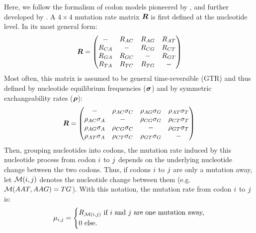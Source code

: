Here, we follow the formalism of \gls{codon} models pioneered by \citet{Muse1994}, and further developed by \citet{Nielsen1998}.
A $4 \times 4$ mutation rate matrix $\bm{R}$ is first defined at the nucleotide level.
In its most general form:
\begin{equation}
    \label{eq:mutrates}
    \bm{R} =
    \begin{pmatrix}
        - & {R_{AC}} & {R_{AG}} & {R_{AT}} \\
        {R_{CA}} &                 - & {R_{CG}} & {R_{CT}} \\
        {R_{GA}} & {R_{GC}} &                 - & {R_{GT}} \\
        {R_{TA}} & {R_{TC}} & {R_{TG}} & -
    \end{pmatrix}
\end{equation}
Most often, this matrix is assumed to be general time-reversible (GTR) and thus defined by nucleotide equilibrium frequencies ($\bm{\sigma}$) and by symmetric exchangeability rates ($\bm{\rho}$):
\begin{equation}
    \label{eq:mutrates-GTR}
    \bm{R} =
    \begin{pmatrix}
        - & {\rho_{AC}\sigma_C} & {\rho_{AG}\sigma_G} & {\rho_{AT}\sigma_T} \\
        {\rho_{AC}\sigma_A} &                        - & {\rho_{CG}\sigma_G} & {\rho_{CT}\sigma_T} \\
        {\rho_{AG}\sigma_A} & {\rho_{CG}\sigma_C} &                        - & {\rho_{GT}\sigma_T} \\
        {\rho_{AT}\sigma_A} & {\rho_{CT}\sigma_C} & {\rho_{GT}\sigma_G} & -
    \end{pmatrix}
\end{equation}
Then, grouping nucleotides into codons, the mutation rate induced by this nucleotide process from \gls{codon} ${i}$ to ${j}$ depends on the underlying nucleotide change between the two codons.
Thus, if codons ${i}$ to ${j}$ are only a mutation away, let $\mathcal{M}({i}, {j})$ denotes the nucleotide change between them (e.g. $\mathcal{M}(AAT, AAG) = TG$).
With this notation, the mutation rate from \gls{codon} ${i}$ to ${j}$ is:
\begin{equation}
    \mu_{{i}, {j}} =
    \begin{dcases}
        R_{\mathcal{M}({i}, {j})} \text{ if ${i}$ and ${j}$ are one mutation away,} \\
        0 \text{ else.}
    \end{dcases}
\end{equation}

